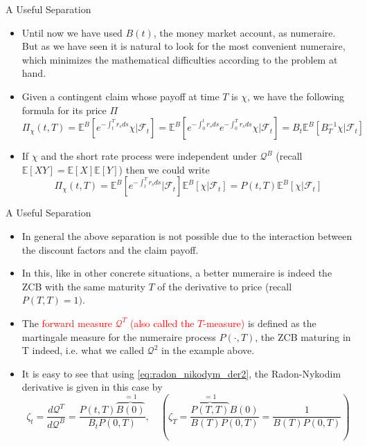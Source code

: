\documentclass{beamer}
\begin{document}
\begin{frame}{A Useful Separation}
  \begin{itemize}
  \item<1-> Until now we have used $B(t)$, the money market account, as numeraire. But as we have seen it is natural to look for the most convenient numeraire, which minimizes the mathematical difficulties according to the problem at hand.
  \item<2-> Given a contingent claim whose payoff at time $T$ is $\chi$, we have the following formula for its price $\Pi$
    \begin{equation*}
      \Pi_\chi(t,T)=\mathbb{E}^B\left[e^{-\int_t^T r_s ds}\chi\bigg|\mathcal{F}_t \right]=\mathbb{E}^B\left[e^{-\int_0^t r_s ds}e^{-\int_0^T r_s ds}\chi\bigg|\mathcal{F}_t \right]=B_t\mathbb{E}^B\left[B^{-1}_T\chi|\mathcal{F}_t\right]
    \end{equation*}
  \item<3-> If $\chi$ and the short rate process were independent under $\mathcal{Q}^B$ (recall $\mathbb{E}[XY]=\mathbb{E}[X]\mathbb{E}[Y]$) then we could write
    \begin{equation*}
      \Pi_\chi(t,T)=\mathbb{E}^B\left[e^{-\int_t^T r_s ds}\bigg|\mathcal{F}_t\right]\mathbb{E}^B\left[\chi|\mathcal{F}_t\right] = P(t,T)\mathbb{E}^B\left[\chi|\mathcal{F}_t\right]
    \end{equation*}
  \end{itemize}
\end{frame}

\begin{frame}{A Useful Separation}
  \begin{itemize}
  \item<1-> In general the above separation is not possible due to the interaction between the discount factors and the claim payoff. 
  \item<2-> In this, like in other concrete situations, a better numeraire is indeed the ZCB with the same maturity $T$ of the derivative to price (recall $P(T,T)=1)$.
  \item<3-> The \textcolor{red}{forward measure $\mathcal{Q}^T$ (also called the $T$-measure)} is defined as the martingale measure for the numeraire process $P(\cdot,T)$, the ZCB maturing in T indeed, i.e. what we called $\mathcal{Q}^2$ in the example above.
  \item<4-> It is easy to see that using \cref{eq:radon_nikodym_der2}, the Radon-Nykodim derivative is given in this case by
    \begin{equation}
      \zeta_t = \frac{d\mathcal{Q}^T}{d\mathcal{Q}^B} = \frac{P(t,T)\overbrace{B(0)}^{=1}}{B_t P(0,T)} ,\quad\left(\zeta_T=\frac{\overbrace{P(T,T)}^{=1}B(0)}{B(T)P(0,T)}=\frac{1}{B(T)P(0,T)}\right)
      \label{eq:radon_nikodym_t_forward}
    \end{equation}
  \end{itemize}
\end{frame}
\end{document}
